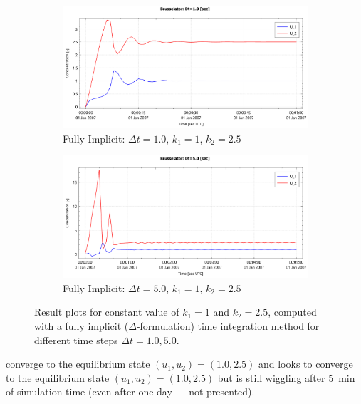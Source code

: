 \documentclass{mooiman_memo}
\newcommand{\Dt}{\Delta t}
\begin{document}
\begin{figure}[H]
    \begin{subfigure}{0.49\textwidth}
        \includegraphics[width=\textwidth]{figures/brusselator_imp_dt=1d00.pdf}
        \caption{Fully Implicit: $\Dt=1.0$, $k_1=1$, $k_2=2.5$}\label{fig:imp_dt=1d00}
    \end{subfigure}
    \hfill
    \begin{subfigure}{0.49\textwidth}
        \includegraphics[width=\textwidth]{figures/brusselator_imp_dt=5d00.pdf}
        \caption{Fully Implicit: $\Dt=5.0$, $k_1=1$, $k_2=2.5$}\label{fig:imp_dt=5d00}
    \end{subfigure}
    \caption{Result plots for constant value of $k_1 = 1$ and $k_2 =2.5$, computed with a fully implicit ($\Delta$-formulation) time integration method for different time steps $\Dt = 1.0, 5.0$.
    }
\end{figure}
 converge to the equilibrium state $(u_1, u_2) = (1.0, 2.5)$ and
 looks to converge to the equilibrium state $(u_1, u_2) = (1.0, 2.5)$ but is still wiggling after \SI{5}{\minute} of simulation time (even after one day --- not presented).
%
\end{document}
